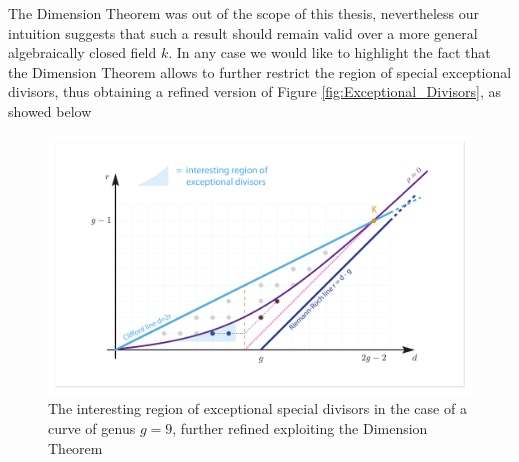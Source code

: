 	The Dimension Theorem was out of the scope of this thesis, nevertheless our intuition suggests that such a result should remain valid over a more general algebraically closed field $k$. In any case we would like to highlight the fact that the Dimension Theorem allows to further restrict the region of special exceptional divisors, thus obtaining a refined version of Figure \ref{fig:Exceptional_Divisors}, as showed below
	\begin{figure}[ht]
		\centering
		\includegraphics[width=\textwidth]{Exceptional_Divisors_BN.pdf}
		\caption{The interesting region of exceptional special divisors in the case of a curve of genus $g=9$, further refined exploiting the Dimension Theorem }
	\end{figure}








